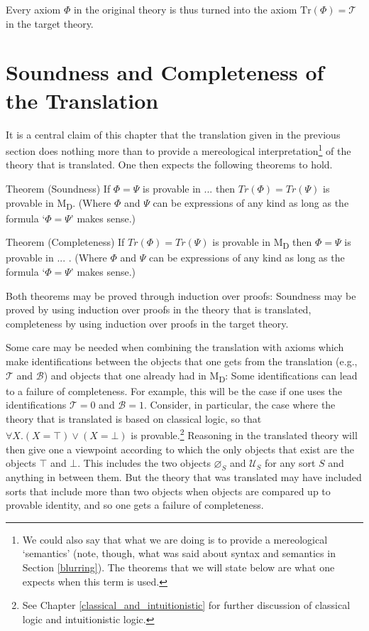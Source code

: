 \documentclass[12pt]{book}
\begin{document}
Every axiom $\Phi$ in the original theory is thus turned into the axiom $\mathrm{Tr}(\Phi) = \mathcal{T}$ in the target theory.

\section{Soundness and Completeness of the Translation}
It is a central claim of this chapter that the translation given in the previous section does nothing more than to provide a mereological interpretation\footnote{We could also say that what we are doing is to provide a mereological `semantics' (note, though, what was said about syntax and semantics in Section \ref{blurring}). The theorems that we will state below are what one expects when this term is used.} of the theory that is translated. One then expects the following theorems to hold.

Theorem (Soundness)
If $\Phi = \Psi$ is provable in ... then $Tr(\Phi) = Tr(\Psi)$ is provable in M\textsubscript{D}. (Where $\Phi$ and $\Psi$ can be expressions of any kind as long as the formula `$\Phi = \Psi$' makes sense.)

Theorem (Completeness)
If $Tr(\Phi) = Tr(\Psi)$ is provable in M\textsubscript{D} then $\Phi = \Psi$ is provable in ... . (Where $\Phi$ and $\Psi$ can be expressions of any kind as long as the formula `$\Phi = \Psi$' makes sense.)

Both theorems may be proved through induction over proofs: Soundness may be proved by using induction over proofs in the theory that is translated, completeness by using induction over proofs in the target theory.

Some care may be needed when combining the translation with axioms which make identifications between the objects that one gets from the translation (e.g., $\mathcal{T}$ and $\mathcal{B}$) and objects that one already had in M\textsubscript{D}: Some identifications can lead to a failure of completeness. For example, this will be the case if one uses the identifications $\mathcal{T} = 0$ and $\mathcal{B} = 1$. Consider, in particular, the case where the theory that is translated is based on classical logic, so that $\forall X.(X = \top) \vee (X = \bot)$ is provable.\footnote{See Chapter \ref{classical_and_intuitionistic} for further discussion of classical logic and intuitionistic logic.} Reasoning in the translated theory will then give one a viewpoint according to which the only objects that exist are the objects $\top$ and $\bot$. This includes the two objects $\varnothing_S$ and $\mathcal{U}_S$ for any sort $S$ and anything in between them. But the theory that was translated may have included sorts that include more than two objects when objects are compared up to provable identity, and so one gets a failure of completeness.
\end{document}
